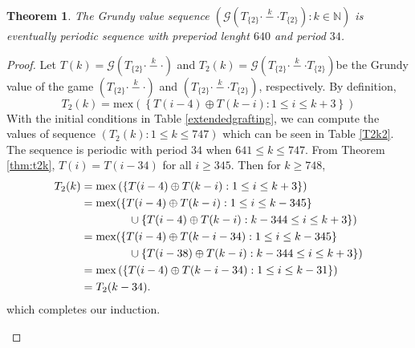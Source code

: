 \documentclass[12pt]{elsarticle}
\newtheorem{theorem}{Theorem}[section]
\newtheorem*{theorem A}{Theorem A}
\newtheorem*{theorem B}{N\"olker's Theorem}
\theoremstyle{remark}
\theoremstyle{remark}
\theoremstyle{definition}
\begin{document}
\begin{theorem}
	The Grundy value sequence $\left(\mathcal{G}\left(T_{\{2\}} \stackrel{k}{\cdot - \cdot} T_{\{2\}}\right) : k \in \mathbb{N}\right)$ is eventually periodic sequence with preperiod lenght $640$ and period $34$.
\end{theorem}
\begin{proof}
	Let $T(k) = \mathcal{G}\left(T_{\{2\}} \stackrel{k}{\cdot - \cdot}\right)$ and $T_2(k) = \mathcal{G}\left(T_{\{2\}} \stackrel{k}{\cdot - \cdot} T_{\{2\}}\right)$be the Grundy value of the game $\left(T_{\{2\}} \stackrel{k}{\cdot - \cdot}\right)$ and $\left(T_{\{2\}} \stackrel{k}{\cdot - \cdot} T_{\{2\}}\right)$, respectively. By definition,
	\begin{equation*}
		T_2(k) = \mathrm{mex}\left(\left\{T(i-4) \oplus T(k-i): 1 \le i \le k+3 \right\}\right)
	\end{equation*}
	With the initial conditions in Table \ref{extendedgrafting}, we can compute the values of sequence $\left(T_2(k): 1 \le k \le 747 \right)$ which can be seen in Table \ref{T2k2}. The sequence is periodic with period $34$ when $641 \le k \le 747$. From Theorem \ref{thm:t2k}, $T(i) = T(i-34)$ for all $i \ge 345$. Then for $k \ge 748$,
	\begin{align*}
		T_2(k) &= \mathrm{mex}\left(\left\{T(i-4) \oplus T(k-i): 1 \le i \le k+3 \right\}\right)\\
		&= \mathrm{mex}(\left\{T(i-4) \oplus T(k-i): 1 \le i \le k-345 \right\}\\
		&\hspace{1.5cm} \cup \left\{T(i-4) \oplus T(k-i): k-344 \le i \le k+3 \right\})\\
		&= \mathrm{mex}(\left\{T(i-4) \oplus T(k-i-34): 1 \le i \le k-345 \right\}\\
		&\hspace{1.5cm} \cup \left\{T(i-38) \oplus T(k-i): k-344 \le i \le k+3 \right\})\\
		&= \mathrm{mex}\left(\left\{T(i-4) \oplus T(k-i-34): 1 \le i \le k-31 \right\}\right)\\
		&= T_{2}(k-34).
	\end{align*}
	which completes our induction.
	\begin{figure}
		\centering
		
		\begin{tikzpicture}[x=0.75pt,y=0.75pt,yscale=-1,xscale=1]
			

\end{tikzpicture}
\end{figure}
\end{proof}
\end{document}
